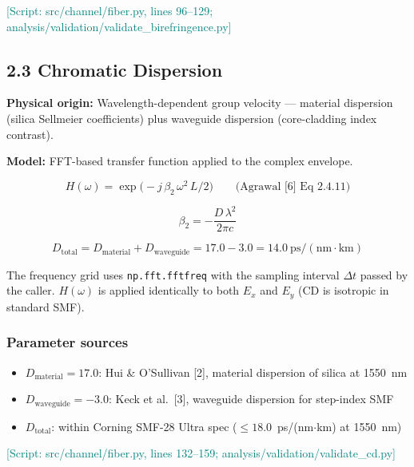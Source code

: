 \documentclass[11pt,a4paper]{article}
\newcommand{\scriptref}[1]{\textcolor{teal}{[Script: #1]}}
\begin{document}
\scriptref{src/channel/fiber.py, lines 96--129;
  analysis/validation/validate\_birefringence.py}

\subsection{2.3 Chromatic Dispersion}
\label{sec:cd}

\textbf{Physical origin:} Wavelength-dependent group velocity --- material
dispersion (silica Sellmeier coefficients) plus waveguide dispersion
(core-cladding index contrast).

\textbf{Model:} FFT-based transfer function applied to the complex envelope.

\begin{equation}
  H(\omega) = \exp\!\bigl(-j\,\beta_2\,\omega^2\,L/2\bigr)
  \qquad\text{(Agrawal [6] Eq 2.4.11)}
\end{equation}

\begin{equation}
  \beta_2 = -\frac{D\,\lambda^2}{2\pi c}
\end{equation}

\begin{equation}
  D_{\text{total}} = D_{\text{material}} + D_{\text{waveguide}}
  = 17.0 - 3.0 = 14.0~\text{ps}/(\text{nm}\cdot\text{km})
\end{equation}

The frequency grid uses \texttt{np.fft.fftfreq} with the sampling interval
$\Delta t$ passed by the caller.  $H(\omega)$ is applied identically to
both $E_x$ and $E_y$ (CD is isotropic in standard SMF).

\subsubsection*{Parameter sources}
\begin{itemize}[nosep]
  \item $D_{\text{material}} = 17.0$: Hui \& O'Sullivan [2],
    material dispersion of silica at 1550~nm
  \item $D_{\text{waveguide}} = -3.0$: Keck et al.\ [3],
    waveguide dispersion for step-index SMF
  \item $D_{\text{total}}$: within Corning SMF-28 Ultra spec
    ($\leq 18.0$~ps/(nm$\cdot$km) at 1550~nm)
\end{itemize}

\scriptref{src/channel/fiber.py, lines 132--159;
  analysis/validation/validate\_cd.py}
\end{document}
